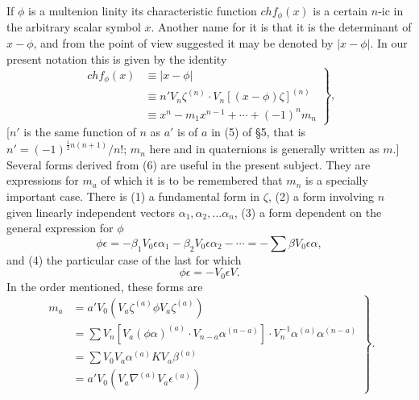\documentclass[11pt]{article}
\begin{document}
\indent If $\phi$ is a multenion linity its characteristic function $chf_\phi(x)$ is a certain $n$-ic in the arbitrary scalar symbol $x$. Another name for it is that it is the determinant of $x-\phi$, and from the point of view suggested it may be denoted by $|x-\phi|$. In our present notation this is given by the identity
\begin{equation}\left.\begin{aligned}chf_\phi(x)&\equiv|x-\phi|\\&\equiv n'V_n\zeta^{(n)}\cdot V_n[(x-\phi)\zeta]^{(n)}\\&\equiv x^n-m_1x^{n-1}+\cdots+(-1)^nm_n\end{aligned}\right\},\tag{6}\end{equation}
[$n'$ is the same function of $n$ as $a'$ is of $a$ in (5) of §5, that is $n'=(-1)^{\frac12n(n+1)}/n!$; $m_n$ here and in quaternions is generally written as $m$.] Several forms derived from (6) are useful in the present subject. They are expressions for $m_a$ of which it is to be remembered that $m_n$ is a specially important case. There is (1) a fundamental form in $\zeta$, (2) a form involving $n$ given linearly independent vectors $\alpha_1,\alpha_2,\ldots\alpha_n$, (3) a form dependent on the general expression for $\phi$
\begin{equation}\phi\epsilon=-\beta_1V_0\epsilon\alpha_1-\beta_2V_0\epsilon\alpha_2-\cdots=-\sum\beta V_0\epsilon\alpha,\tag{7}\end{equation}
and (4) the particular case of the last for which
\begin{equation}\phi\epsilon=-V_0\epsilon V.\tag{8}\end{equation}
In the order mentioned, these forms are
\begin{equation}\left.\begin{aligned}m_a&=a'V_0(V_a\zeta^{(a)}\phi V_a\zeta^{(a)})\\&=\sum V_n[V_a(\phi\alpha)^{(a)}\cdot V_{n-a}\alpha^{(n-a)}]\cdot V_n^{-1}\alpha^{(a)}\alpha^{(n-a)}\\&=\sum V_0V_a\alpha^{(a)}KV_a\beta^{(a)}\\&=a'V_0(V_a\nabla^{(a)}V_a\epsilon^{(a)})\end{aligned}\right\}.\tag{9}\end{equation}
\end{document}
